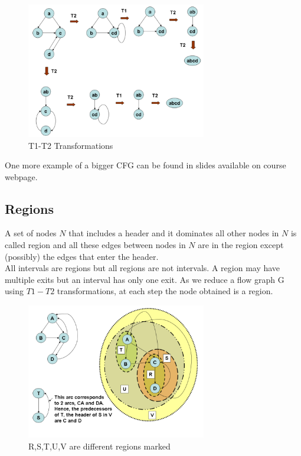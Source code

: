 \documentclass{article}
\begin{document}
\begin{figure}[h]
    \centering
    \includegraphics[width=0.7\textwidth]{Images/t1t2.png}
    \caption{T1-T2 Transformations}
    \label{fig:T1T2}
\end{figure}

One more example of a bigger CFG can be found in slides available on course webpage.

\subsection*{Regions}
A set of nodes $N$ that includes a header and it dominates all other nodes in $N$ is called region and all these edges between nodes in $N$ are in the region except (possibly) the edges that enter the header. \\
All intervals are regions but all regions are not intervals. A region may have multiple exits but an interval has only one exit. As we reduce a flow graph G using $T1-T2$ transformations, at each step the node obtained is a region.

\begin{figure}[h]
    \centering
    \includegraphics[width=0.7\textwidth]{Images/region.png}
    \caption{R,S,T,U,V are different regions marked}
    \label{fig:Regions}
\end{figure}
\end{document}
